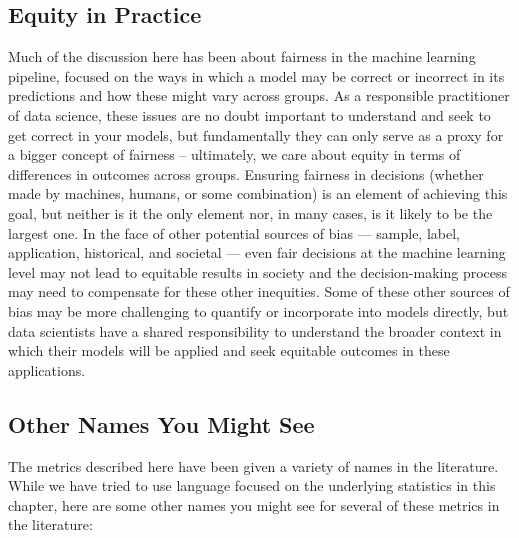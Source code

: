 \documentclass[]{krantz}
\begin{document}
\subsection{Equity in Practice}\label{equity-in-practice}

Much of the discussion here has been about fairness in the machine
learning pipeline, focused on the ways in which a model may be correct
or incorrect in its predictions and how these might vary across groups.
As a responsible practitioner of data science, these issues are no doubt
important to understand and seek to get correct in your models, but
fundamentally they can only serve as a proxy for a bigger concept of
fairness -- ultimately, we care about equity in terms of differences in
outcomes across groups. Ensuring fairness in decisions (whether made by
machines, humans, or some combination) is an element of achieving this
goal, but neither is it the only element nor, in many cases, is it
likely to be the largest one. In the face of other potential sources of
bias --- sample, label, application, historical, and societal --- even
fair decisions at the machine learning level may not lead to equitable
results in society and the decision-making process may need to
compensate for these other inequities. Some of these other sources of
bias may be more challenging to quantify or incorporate into models
directly, but data scientists have a shared responsibility to understand
the broader context in which their models will be applied and seek
equitable outcomes in these applications.

\subsection{Other Names You Might See}\label{other-names-you-might-see}

The metrics described here have been given a variety of names in the
literature. While we have tried to use language focused on the
underlying statistics in this chapter, here are some other names you
might see for several of these metrics in the literature:
\end{document}
